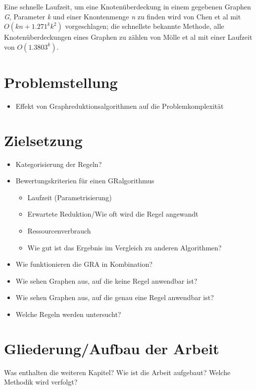 Eine schnelle Laufzeit, um eine Knotenüberdeckung in einem gegebenen Graphen \emph{G}, Parameter \emph{k} und einer Knontenmenge \emph{n} zu finden wird von Chen et al \cite{paper:4} mit $O(kn + 1.271^{k}k^{2})$ vorgeschlagen; die schnellste bekannte Methode, alle Knotenüberdeckungen eines Graphen zu zählen von Mölle et al \cite{paper:5} mit einer Laufzeit von $O(1.3803^{k})$.

\section{Problemstellung}
\label{ch:Einleitung:sec:Problemstellung}

\begin{itemize}
\item Effekt von Graphreduktionsalgorithmen auf die Problemkomplexität
\end{itemize}

\section{Zielsetzung}
\label{ch:Einleitung:sec:Zielsetzung}

\begin{itemize}
\item Kategorisierung der Regeln?
\item Bewertungskriterien für einen GRalgorithmus
	\begin{itemize}
	\item Laufzeit (Parametrisierung)
	\item Erwartete Reduktion/Wie oft wird die Regel angewandt
	\item Ressourcenverbrauch
	\item Wie gut ist das Ergebnis im Vergleich zu anderen Algorithmen?	
	\end{itemize}
\item Wie funktionieren die GRA in Kombination?
\item Wie sehen Graphen aus, auf die keine Regel anwendbar ist?
\item Wie sehen Graphen aus, auf die genau eine Regel anwendbar ist?
\item Welche Regeln werden untersucht?
\end{itemize}


\section{Gliederung/Aufbau der Arbeit}
\label{ch:Einleitung:sec:Gliederung}

Was enthalten die weiteren Kapitel? Wie ist die Arbeit aufgebaut? Welche Methodik wird verfolgt?


